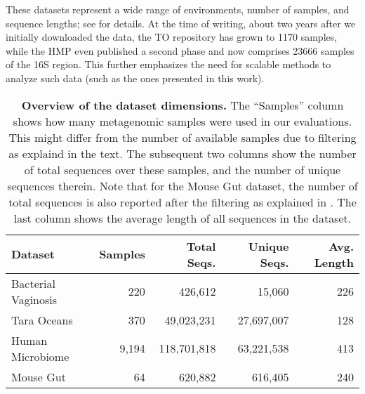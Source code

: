 These datasets represent a wide range of environments, number of samples, and sequence lengths;
see  for details.
At the time of writing, about two years after we initially downloaded the data,
the \ac{TO} repository has grown to \num{1 170} samples,
while the \ac{HMP} even published a second phase and now comprises \num{23 666} samples of the 16S region.
This further emphasizes the need for scalable methods to analyze such data (such as the ones presented in this work).

\begin{table}[htpb]
\caption[Overview of the dataset dimensions]{
\textbf{Overview of the dataset dimensions.}
The ``Samples'' column shows how many metagenomic samples were used in our evaluations.
This might differ from the number of available samples due to filtering as explaind in the text.
The subsequent two columns show the number of total sequences over these samples,
and the number of unique sequences therein.
Note that for the Mouse Gut dataset, the number of total sequences is also reported after the filtering
as explained in .
The last column shows the average length of all sequences in the dataset.
}
\label{tab:MetagenomicDatasetsOverview}
{
    \begin{center}
    \begin{tabular}{lrrrr}
    \toprule
    Dataset             & Samples &     Total Seqs. &     Unique Seqs. & Avg. Length \\
    \midrule
    Bacterial Vaginosis &     220 &         426,612 &           15,060 &         226 \\
    Tara Oceans         &     370 &      49,023,231 &       27,697,007 &         128 \\
    Human Microbiome    &   9,194 &     118,701,818 &       63,221,538 &         413 \\
    Mouse Gut           &      64 &         620,882 &          616,405 &         240 \\
    \bottomrule
    \end{tabular}
    \end{center}
}
\end{table}

